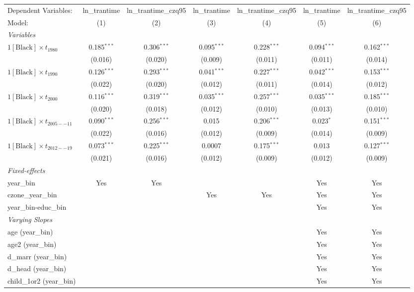 \begin{tabular}{lcccccc}
\tabularnewline\midrule\midrule
Dependent Variables:&ln\_trantime&ln\_trantime\_czq95&ln\_trantime&ln\_trantime\_czq95&ln\_trantime&ln\_trantime\_czq95\\
Model:&(1) & (2) & (3) & (4) & (5) & (6)\\
\midrule \emph{Variables}&   &   &   &   &   &  \\
$1[\text{Black}] \times t_{1980}$ & 0.185$^{***}$ & 0.306$^{***}$ & 0.095$^{***}$ & 0.228$^{***}$ & 0.094$^{***}$ & 0.162$^{***}$\\
  &(0.016) & (0.020) & (0.009) & (0.011) & (0.011) & (0.014)\\
$1[\text{Black}] \times t_{1990}$ & 0.126$^{***}$ & 0.293$^{***}$ & 0.041$^{***}$ & 0.227$^{***}$ & 0.042$^{***}$ & 0.153$^{***}$\\
  &(0.022) & (0.020) & (0.012) & (0.011) & (0.014) & (0.012)\\
$1[\text{Black}] \times t_{2000}$ & 0.116$^{***}$ & 0.319$^{***}$ & 0.035$^{***}$ & 0.257$^{***}$ & 0.035$^{***}$ & 0.185$^{***}$\\
  &(0.020) & (0.018) & (0.012) & (0.010) & (0.013) & (0.010)\\
$1[\text{Black}] \times t_{2005--11}$ & 0.090$^{***}$ & 0.256$^{***}$ & 0.015 & 0.206$^{***}$ & 0.023$^{*}$ & 0.151$^{***}$\\
  &(0.022) & (0.016) & (0.012) & (0.009) & (0.014) & (0.009)\\
$1[\text{Black}] \times t_{2012--19}$ & 0.073$^{***}$ & 0.225$^{***}$ & 0.0007 & 0.175$^{***}$ & 0.013 & 0.127$^{***}$\\
  &(0.021) & (0.016) & (0.012) & (0.009) & (0.012) & (0.009)\\
\midrule \emph{Fixed-effects}&   &   &   &   &   &  \\
year\_bin & Yes & Yes &  &  & Yes & Yes\\
czone\_year\_bin &  &  & Yes & Yes & Yes & Yes\\
year\_bin-educ\_bin &  &  &  &  & Yes & Yes\\
\midrule \emph{Varying Slopes}&   &   &   &   &   &  \\
age (year\_bin) &  &  &  &  & Yes & Yes\\
age2 (year\_bin) &  &  &  &  & Yes & Yes\\
d\_marr (year\_bin) &  &  &  &  & Yes & Yes\\
d\_head (year\_bin) &  &  &  &  & Yes & Yes\\
child\_1or2 (year\_bin) &  &  &  &  & Yes & Yes\\

\end{tabular}
